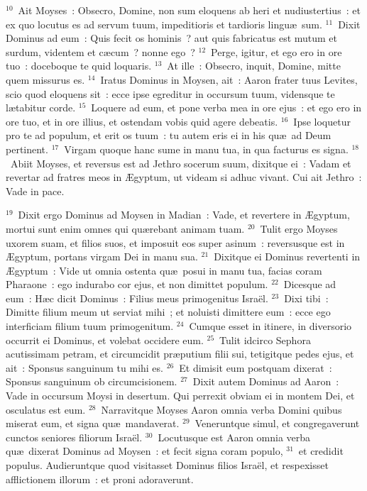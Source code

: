 ${}^{10}$~Ait Moyses~: Obsecro, Domine, non sum eloquens ab heri et nudiustertius~: et ex quo locutus es ad servum tuum, impeditioris et tardioris lingu\ae\ sum.
${}^{11}$~Dixit Dominus ad eum~: Quis fecit os hominis~? aut quis fabricatus est mutum et surdum, videntem et c\ae cum~? nonne ego~?
${}^{12}$~Perge, igitur, et ego ero in ore tuo~: doceboque te quid loquaris.
${}^{13}$~At ille~: Obsecro, inquit, Domine, mitte quem missurus es.
${}^{14}$~Iratus Dominus in Moysen, ait~: Aaron frater tuus Levites, scio quod eloquens sit~: ecce ipse egreditur in occursum tuum, vidensque te l\ae tabitur corde.
${}^{15}$~Loquere ad eum, et pone verba mea in ore ejus~: et ego ero in ore tuo, et in ore illius, et ostendam vobis quid agere debeatis.
${}^{16}$~Ipse loquetur pro te ad populum, et erit os tuum~: tu autem eris ei in his qu\ae\ ad Deum pertinent.
${}^{17}$~Virgam quoque hanc sume in manu tua, in qua facturus es signa.
${}^{18}$~Abiit Moyses, et reversus est ad Jethro socerum suum, dixitque ei~: Vadam et revertar ad fratres meos in \AE gyptum, ut videam si adhuc vivant. Cui ait Jethro~: Vade in pace.


${}^{19}$~Dixit ergo Dominus ad Moysen in Madian~: Vade, et revertere in \AE gyptum, mortui sunt enim omnes qui qu\ae rebant animam tuam.
${}^{20}$~Tulit ergo Moyses uxorem suam, et filios suos, et imposuit eos super asinum~: reversusque est in \AE gyptum, portans virgam Dei in manu sua.
${}^{21}$~Dixitque ei Dominus revertenti in \AE gyptum~: Vide ut omnia ostenta qu\ae\ posui in manu tua, facias coram Pharaone~: ego indurabo cor ejus, et non dimittet populum.
${}^{22}$~Dicesque ad eum~: H\ae c dicit Dominus~: Filius meus primogenitus Isra\"el.
${}^{23}$~Dixi tibi~: Dimitte filium meum ut serviat mihi~; et noluisti dimittere eum~: ecce ego interficiam filium tuum primogenitum.
${}^{24}$~Cumque esset in itinere, in diversorio occurrit ei Dominus, et volebat occidere eum.
${}^{25}$~Tulit idcirco Sephora acutissimam petram, et circumcidit pr\ae putium filii sui, tetigitque pedes ejus, et ait~: Sponsus sanguinum tu mihi es.
${}^{26}$~Et dimisit eum postquam dixerat~: Sponsus sanguinum ob circumcisionem.
${}^{27}$~Dixit autem Dominus ad Aaron~: Vade in occursum Moysi in desertum. Qui perrexit obviam ei in montem Dei, et osculatus est eum.
${}^{28}$~Narravitque Moyses Aaron omnia verba Domini quibus miserat eum, et signa qu\ae\ mandaverat.
${}^{29}$~Veneruntque simul, et congregaverunt cunctos seniores filiorum Isra\"el.
${}^{30}$~Locutusque est Aaron omnia verba qu\ae\ dixerat Dominus ad Moysen~: et fecit signa coram populo,
${}^{31}$~et credidit populus. Audieruntque quod visitasset Dominus filios Isra\"el, et respexisset afflictionem illorum~: et proni adoraverunt.

